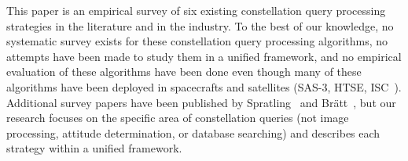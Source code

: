 This paper is an empirical survey of six existing constellation query processing strategies in the literature and in the industry.
To the best of our knowledge, no systematic survey exists for these constellation query processing algorithms, no attempts have been made to study them in a unified framework, and no empirical evaluation of these algorithms have been done even though many of these algorithms have been deployed in spacecrafts and satellites (SAS-3, HTSE, ISC~\cite{gottlieb:spacecraftAttitudeDetermination,mortari:pyramidIdentification}).
Additional survey papers have been published by Spratling~\cite{spratling:surveyStarIdentification} and
Br\"{a}tt~\cite{bratt:analysisStarIdentification}, but our research focuses on the specific area of constellation
queries (not image processing, attitude determination, or database searching) and describes each strategy within a unified framework.


